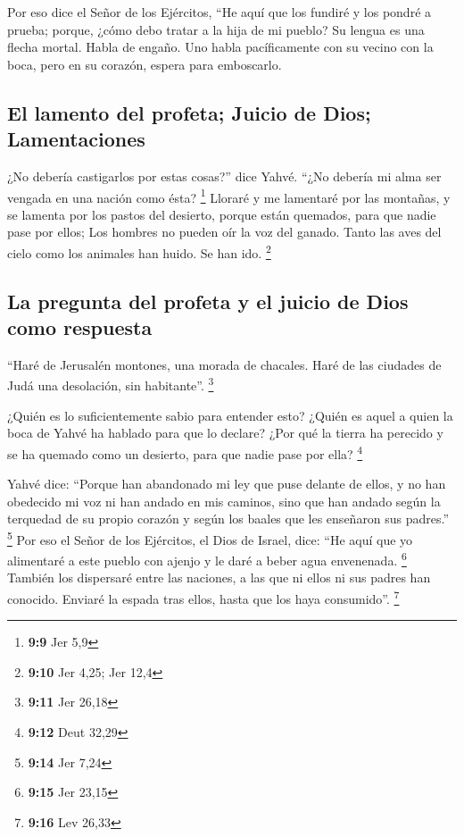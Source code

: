  Por eso dice el Señor de los Ejércitos, ``He aquí que los
fundiré y los pondré a prueba; porque, ¿cómo debo tratar a la hija de mi
pueblo?  Su lengua es una flecha mortal. Habla de engaño.
Uno habla pacíficamente con su vecino con la boca, pero en su corazón,
espera para emboscarlo.

\hypertarget{el-lamento-del-profeta-juicio-de-dios-lamentaciones}{%
\subsection{El lamento del profeta; Juicio de Dios;
Lamentaciones}\label{el-lamento-del-profeta-juicio-de-dios-lamentaciones}}

 ¿No debería castigarlos por estas cosas?'' dice Yahvé.
``¿No debería mi alma ser vengada en una nación como ésta? \footnote{\textbf{9:9}
  Jer 5,9}  Lloraré y me lamentaré por las montañas, y se
lamenta por los pastos del desierto, porque están quemados, para que
nadie pase por ellos; Los hombres no pueden oír la voz del ganado. Tanto
las aves del cielo como los animales han huido. Se han ido. \footnote{\textbf{9:10}
  Jer 4,25; Jer 12,4}

\hypertarget{la-pregunta-del-profeta-y-el-juicio-de-dios-como-respuesta}{%
\subsection{La pregunta del profeta y el juicio de Dios como
respuesta}\label{la-pregunta-del-profeta-y-el-juicio-de-dios-como-respuesta}}

 ``Haré de Jerusalén montones, una morada de chacales.
Haré de las ciudades de Judá una desolación, sin habitante''.
\footnote{\textbf{9:11} Jer 26,18}

 ¿Quién es lo suficientemente sabio para entender esto?
¿Quién es aquel a quien la boca de Yahvé ha hablado para que lo declare?
¿Por qué la tierra ha perecido y se ha quemado como un desierto, para
que nadie pase por ella? \footnote{\textbf{9:12} Deut 32,29}

 Yahvé dice: ``Porque han abandonado mi ley que puse
delante de ellos, y no han obedecido mi voz ni han andado en mis
caminos,  sino que han andado según la terquedad de su
propio corazón y según los baales que les enseñaron sus padres.''
\footnote{\textbf{9:14} Jer 7,24}  Por eso el Señor de
los Ejércitos, el Dios de Israel, dice: ``He aquí que yo alimentaré a
este pueblo con ajenjo y le daré a beber agua envenenada. \footnote{\textbf{9:15}
  Jer 23,15}  También los dispersaré entre las naciones,
a las que ni ellos ni sus padres han conocido. Enviaré la espada tras
ellos, hasta que los haya consumido''. \footnote{\textbf{9:16} Lev 26,33}

